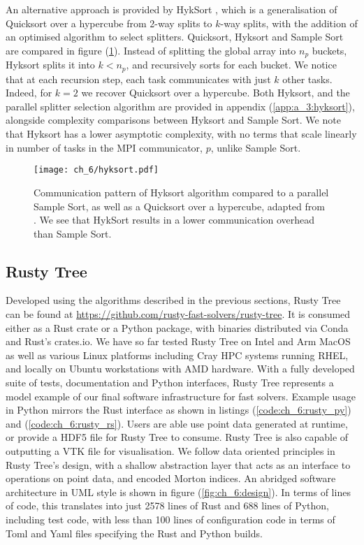 An alternative approach is provided by HykSort \cite{sundar2013hyksort}, which is a generalisation of Quicksort over a hypercube \cite{wagar1987hyperquicksort} from 2-way splits to $k$-way splits, with the addition of an optimised algorithm to select splitters. Quicksort, Hyksort and Sample Sort are compared in figure (\ref{fig:ch_6:hyksort}). Instead of splitting the global array into $n_p$ buckets, Hyksort splits it into $k < n_p$, and recursively sorts for each bucket. We notice that at each recursion step, each task communicates with just $k$ other tasks. Indeed, for $k=2$ we recover Quicksort over a hypercube. Both Hyksort, and the parallel splitter selection algorithm are provided in appendix (\ref{app:a_3:hyksort}), alongside complexity comparisons between Hyksort and Sample Sort. We note that Hyksort has a lower asymptotic complexity, with no terms that scale linearly in number of tasks in the MPI communicator, $p$, unlike Sample Sort.

\begin{figure}
    \centerline{\texttt{[image: ch\_6/hyksort.pdf]}}
    \caption{Communication pattern of Hyksort algorithm compared to a parallel Sample Sort, as well as a Quicksort over a hypercube, adapted from \cite{sundar2013hyksort}. We see that HykSort results in a lower communication overhead than Sample Sort.}
    \label{fig:ch_6:hyksort}
\end{figure}

\subsection*{Rusty Tree}

Developed using the algorithms described in the previous sections, Rusty Tree can be found at \url{https://github.com/rusty-fast-solvers/rusty-tree}. It is consumed either as a Rust crate or a Python package, with binaries distributed via Conda and Rust's crates.io. We have so far tested Rusty Tree on Intel and Arm MacOS as well as various Linux platforms including Cray HPC systems running RHEL, and locally on Ubuntu workstations with AMD hardware. With a fully developed suite of tests, documentation and Python interfaces, Rusty Tree represents a model example of our final software infrastructure for fast solvers. Example usage in Python mirrors the Rust interface as shown in listings (\ref{code:ch_6:rusty_py}) and (\ref{code:ch_6:rusty_rs}). Users are able use point data generated at runtime, or provide a HDF5 file for Rusty Tree to consume. Rusty Tree is also capable of outputting a VTK file for visualisation.  We follow data oriented principles in Rusty Tree's design, with a shallow abstraction layer that acts as an interface to operations on point data, and encoded Morton indices. An abridged software architecture in UML style is shown in figure (\ref{fig:ch_6:design}). In terms of lines of code, this translates into just 2578 lines of Rust and 688 lines of Python, including test code, with less than 100 lines of configuration code in terms of Toml and Yaml files specifying the Rust and Python builds.

